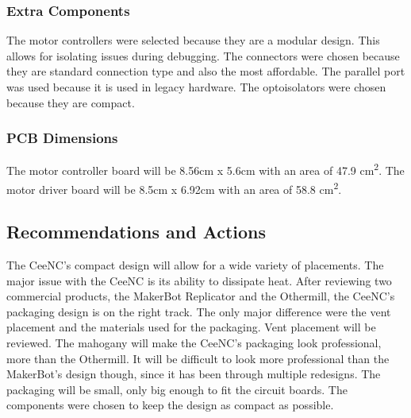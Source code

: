 \subsubsection{Extra Components}
The motor controllers were selected because they are a modular design.
This allows for isolating issues during debugging.
The connectors were chosen because they are standard connection type and also the most affordable.
The parallel port was used because it is used in legacy hardware.
The optoisolators were chosen because they are compact.

\subsubsection{PCB Dimensions}
The motor controller board will be 8.56cm x 5.6cm with an area of 47.9 cm\textsuperscript{2}.
The motor driver board will be 8.5cm x 6.92cm with an area of 58.8 cm\textsuperscript{2}.

\subsection{Recommendations and Actions}
The CeeNC's compact design will allow for a wide variety of placements. 
The major issue with the CeeNC is its ability to dissipate heat.
After reviewing two commercial products, the MakerBot Replicator and the Othermill, the CeeNC's packaging design is on the right track.
The only major difference were the vent placement and the materials used for the packaging.
Vent placement will be reviewed.
The mahogany will make the CeeNC's packaging look professional, more than the Othermill.
It will be difficult to look more professional than the MakerBot's design though, since it has been through multiple redesigns.
The packaging will be small, only big enough to fit the circuit boards.
The components were chosen to keep the design as compact as possible.